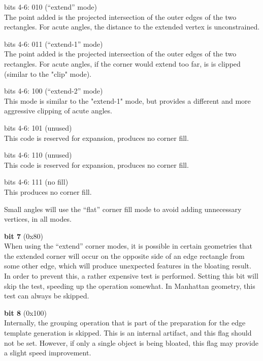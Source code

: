 \begin{description}
\begin{description}
\item{bits 4-6: 010 (``extend'' mode)}\\
The point added is the projected intersection of the outer edges of
the two rectangles.  For acute angles, the distance to the extended
vertex is unconstrained.

\item{bits 4-6: 011 (``extend-1'' mode)}\\
The point added is the projected intersection of the outer edges of
the two rectangles.  For acute angles, if the corner would extend too
far, is is clipped (similar to the "clip" mode).

\item{bits 4-6: 100 (``extend-2'' mode)}\\
This mode is similar to the "extend-1" mode, but provides a different
and more aggressive clipping of acute angles. 

\item{bits 4-6: 101 (unused)}\\
This code is reserved for expansion, produces no corner fill.

\item{bits 4-6: 110 (unused)}\\
This code is reserved for expansion, produces no corner fill.

\item{bits 4-6: 111 (no fill)}\\
This produces no corner fill.                                
\end{description}

Small angles will use the ``flat'' corner fill mode to avoid adding
unnecessary vertices, in all modes.

\item{\bf bit 7} (0x80)\\
When using the ``extend'' corner modes, it is possible in certain
geometries that the extended corner will occur on the opposite side of
an edge rectangle from some other edge, which will produce unexpected
features in the bloating result.  In order to prevent this, a rather
expensive test is performed.  Setting this bit will skip the test,
speeding up the operation somewhat.  In Manhattan geometry, this test
can always be skipped.

\item{\bf bit 8} (0x100)\\
Internally, the grouping operation that is part of the preparation for
the edge template generation is skipped.  This is an internal
artifact, and this flag should not be set.  However, if only a single
object is being bloated, this flag may provide a slight speed
improvement.


\end{description}
